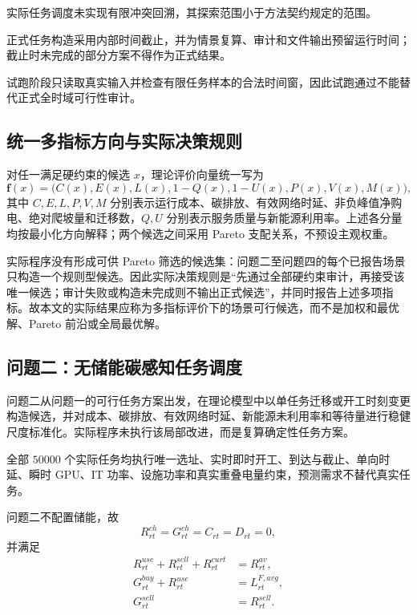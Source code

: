 实际任务调度未实现有限冲突回溯，其探索范围小于方法契约规定的范围。

正式任务构造采用内部时间截止，并为情景复算、审计和文件输出预留运行时间；截止时未完成的部分方案不得作为正式结果。

试跑阶段只读取真实输入并检查有限任务样本的合法时间窗，因此试跑通过不能替代正式全时域可行性审计。


\subsection{统一多指标方向与实际决策规则}

对任一满足硬约束的候选 $x$，理论评价向量统一写为
\begin{equation}
\mathbf f(x)=\bigl(C(x),E(x),L(x),1-Q(x),1-U(x),P(x),V(x),M(x)\bigr),
\end{equation}
其中 $C,E,L,P,V,M$ 分别表示运行成本、碳排放、有效网络时延、非负峰值净购电、绝对爬坡量和迁移数，$Q,U$ 分别表示服务质量与新能源利用率。上述各分量均按最小化方向解释；两个候选之间采用 Pareto 支配关系，不预设主观权重。

实际程序没有形成可供 Pareto 筛选的候选集：问题二至问题四的每个已报告场景只构造一个规则型候选。因此实际决策规则是“先通过全部硬约束审计，再接受该唯一候选；审计失败或构造未完成则不输出正式候选”，并同时报告上述多项指标。故本文的实际结果应称为多指标评价下的场景可行候选，而不是加权和最优解、Pareto 前沿或全局最优解。

\subsection{问题二：无储能碳感知任务调度}

问题二从问题一的可行任务方案出发，在理论模型中以单任务迁移或开工时刻变更构造候选，并对成本、碳排放、有效网络时延、新能源未利用率和等待量进行稳健尺度标准化。实际程序未执行该局部改进，而是复算确定性任务方案。

全部 $50000$ 个实际任务均执行唯一选址、实时即时开工、到达与截止、单向时延、瞬时 GPU、IT 功率、设施功率和真实重叠电量约束，预测需求不替代真实任务。

问题二不配置储能，故
\begin{equation}
R_{rt}^{ch}=G_{rt}^{ch}=C_{rt}=D_{rt}=0,
\end{equation}
并满足
\begin{align}
R_{rt}^{use}+R_{rt}^{sell}+R_{rt}^{curt}&=R_{rt}^{av},\\
G_{rt}^{buy}+R_{rt}^{use}&=L_{rt}^{F,avg},\\
G_{rt}^{sell}&=R_{rt}^{sell}.
\end{align}

